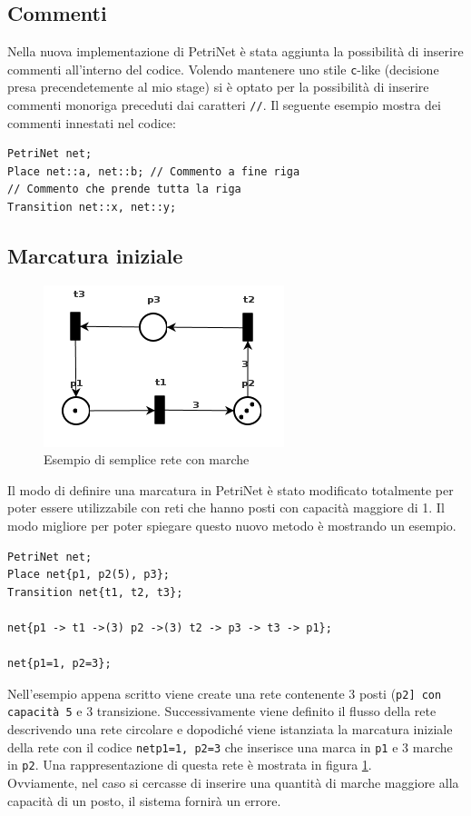 \documentclass[italian,12pt]{book}
\begin{document}
\subsection{Commenti}\label{ssect:new_commenti}
Nella nuova implementazione di PetriNet è stata aggiunta la possibilità di inserire commenti all'interno del 
codice. Volendo mantenere uno stile {\tt c}-like (decisione presa precendetemente al mio stage) si è optato 
per la possibilità di inserire commenti monoriga preceduti dai caratteri {\tt //}. Il seguente esempio mostra 
dei commenti innestati nel codice:
\begin{verbatim}PetriNet net;
Place net::a, net::b; // Commento a fine riga
// Commento che prende tutta la riga
Transition net::x, net::y;
\end{verbatim}

\subsection{Marcatura iniziale}
\begin{figure}[htb]
\centerline{\includegraphics[width=7cm]{img/test_marcature.png}}
\caption{Esempio di semplice rete con marche}\label{fig:test_marcature.png}
\end{figure}
Il modo di definire una marcatura in PetriNet è stato modificato totalmente per poter essere utilizzabile con reti che hanno posti con capacità maggiore di 1.
Il modo migliore per poter spiegare questo nuovo metodo è mostrando un esempio.
\begin{verbatim}PetriNet net;
Place net{p1, p2(5), p3};
Transition net{t1, t2, t3};

net{p1 -> t1 ->(3) p2 ->(3) t2 -> p3 -> t3 -> p1};

net{p1=1, p2=3};
\end{verbatim}

Nell'esempio appena scritto viene create una rete contenente 3 posti ({\tt p2] con capacità 5} e 3 transizione. 
Successivamente viene definito il flusso della rete descrivendo una rete circolare e dopodiché viene istanziata la marcatura iniziale della rete con il codice {\tt net{p1=1, p2=3}}
 che inserisce una marca in {\tt p1} e 3 marche in {\tt p2}. Una rappresentazione di questa rete è mostrata in figura \ref{fig:test_marcature.png}.\\
Ovviamente, nel caso si cercasse di inserire una quantità di marche maggiore alla capacità di un posto, il sistema fornirà un errore.
\end{document}
